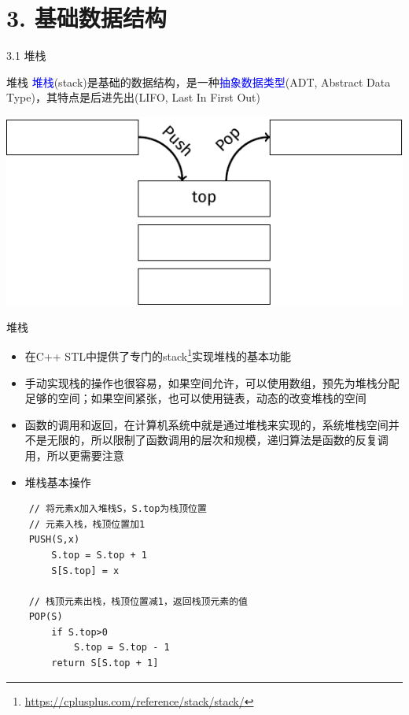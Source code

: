


\frame{\titlepage}
\section{3. 基础数据结构}
\begin{frame}{3.1 堆栈}
    \begin{block}{堆栈}
        \textcolor{blue}{堆栈}(stack)是基础的数据结构，是一种\textcolor{blue}{抽象数据类型}(ADT, Abstract Data Type)，其特点是后进先出(LIFO, Last In First Out)
    \end{block}
    \vfill
    \includegraphics[center]{fig/3-1.pdf}
\end{frame}
\begin{frame}{堆栈}
    \begin{itemize}
        \item 在C++ STL中提供了专门的stack\footnote{\url{https://cplusplus.com/reference/stack/stack/}}实现堆栈的基本功能
        \vfill
        \item 手动实现栈的操作也很容易，如果空间允许，可以使用数组，预先为堆栈分配足够的空间；如果空间紧张，也可以使用链表，动态的改变堆栈的空间
        \vfill
        \item 函数的调用和返回，在计算机系统中就是通过堆栈来实现的，系统堆栈空间并不是无限的，所以限制了函数调用的层次和规模，递归算法是函数的反复调用，所以更需要注意
    \end{itemize}
\end{frame}
\vspace*{4ex}
\begin{itemize}
    \item[] \Large{堆栈基本操作}
\end{itemize}
\begin{lstlisting}
    // 将元素x加入堆栈S，S.top为栈顶位置
    // 元素入栈，栈顶位置加1
    PUSH(S,x) 
        S.top = S.top + 1 
        S[S.top] = x

    // 栈顶元素出栈，栈顶位置减1，返回栈顶元素的值
    POP(S) 
        if S.top>0
            S.top = S.top - 1
        return S[S.top + 1]
\end{lstlisting}
